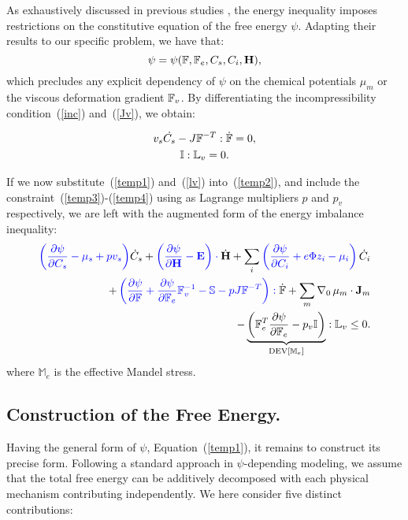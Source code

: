 As exhaustively discussed in previous studies \cite{Plasto,GURTIN}, the energy inequality imposes restrictions on the constitutive equation of the free energy $\psi$. Adapting their results to our specific problem, we have that:
\begin{equation}
\psi = \psi (\mathbb{F},\mathbb{F}_e, C_s, C_i, \mathbf{H}), \label{temp1}
\end{equation}
which precludes any explicit dependency of $\psi$ on the chemical potentials $\mu_m$ or the viscous deformation gradient $\mathbb{F}_v$. By differentiating the incompressibility condition~(\ref{inc}) and~(\ref{Jv}), we obtain:

\begin{gather}
v_s\dot{C_s} - J \mathbb{F}^{-T}:\dot{\mathbb{F}} =0, \label{temp3}\\
\mathbb{I}:\mathbb{L}_v=0. \label{temp4}
\end{gather}

If we now substitute~(\ref{temp1}) and~(\ref{lv}) into~(\ref{temp2}), and include the constraint~(\ref{temp3})-(\ref{temp4}) using as Lagrange multipliers $p$ and $p_v$ respectively, we are left with the augmented form of the energy imbalance inequality:
\begin{equation}
\begin{aligned}
 \color{blue}{\left(\frac{\partial \psi}{\partial C_s}-\mu_s+p v_s\right)}\color{black}\dot{C}_s+\color{blue}\left(\frac{\partial \psi}{\partial \mathbf{H}}-\mathbf{E}\right) \cdot \color{black}\dot{\mathbf{H}}+ \sum_i\color{blue}\left(\frac{\partial \psi}{\partial C_i} + e\Phi z_i-\mu_i\right) \color{black}\dot{C}_i \\
+ \color{blue} \left(\frac{\partial \psi}{\partial \mathbb{F}} + \frac{\partial \psi}{\partial\mathbb{F}_e}\mathbb{F}_v^{-1}- \mathbb{S} - p J \mathbb{F}^{-T}\right): \color{black}\dot{\mathbb{F}}+ \sum_m \nabla_0 \,\mu_m \cdot \mathbf{J}_m \\
- \underbrace{\left(\mathbb{F}_e^T\frac{\partial \psi}{\partial \mathbb{F}_e}-p_v\mathbb{I}\right)}_{\text{DEV}[\mathbb{M}_e]}:\mathbb{L}_v\leq 0 . \label{ineq}
\end{aligned}
\end{equation}
where $\mathbb{M}_e$ is the effective Mandel stress. 
\subsection{Construction of the Free Energy.}
\label{freeenergy}
Having the general form of $\psi$, Equation~(\ref{temp1}), it remains to construct its precise form. Following a standard approach in $\psi$-depending modeling, we assume that the total free energy can be additively decomposed with each physical mechanism contributing independently. We here consider five distinct contributions:

